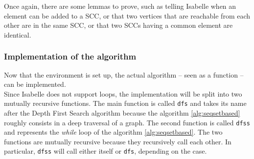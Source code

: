 \documentclass[a4 paper, 12pt]{article}
\theoremstyle{definition}
\begin{document}
Once again, there are some lemmas to prove, such as telling Isabelle when an element can be added to a SCC, or that two vertices that are reachable from each other are in the same SCC, or that two SCCs having a common element are identical.

\subsubsection{Implementation of the algorithm}

Now that the environment is set up, the actual algorithm -- seen as a function -- can be implemented.\\
Since Isabelle does not support loops, the implementation will be split into two mutually recursive functions. The main function is called \texttt{dfs} and takes its name after the Depth First Search algorithm because the algorithm \ref{alg:seqsetbased} roughly consists in a deep traversal of a graph. The second function is called \texttt{dfss} and represents the \textit{while} loop of the algorithm \ref{alg:seqsetbased}. The two functions are mutually recursive because they recursively call each other. In particular, \texttt{dfss} will call either itself or \texttt{dfs}, depending on the case.
\end{document}
